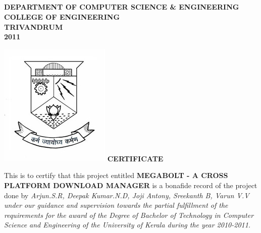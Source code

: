 \begin{cert}
\section*{}
\thispagestyle{empty}
\begin{center}
  {\large \bf DEPARTMENT OF COMPUTER SCIENCE \& ENGINEERING}\\
  {\large \bf COLLEGE OF ENGINEERING}\\
  {\small \bf TRIVANDRUM}\\
  {\small \bf 2011}\\
  \vspace{7.5mm}
  \begin{center}
    \centering
    \includegraphics{pic/cetemblem.jpg}
                    {\underline \large \bf CERTIFICATE}\\
  \end{center}
\end{center}
This is to certify that this project entitled {\bf \textsc MEGABOLT - A CROSS 
  PLATFORM DOWNLOAD MANAGER} is a bonafide record of the project done by 
\it{\textsc Arjun.S.R, Deepak Kumar.N.D, Joji Antony, Sreekanth B, Varun V.V} 
under our guidance and supervision towards the partial fulfillment of the 
requirements for the award of the Degree of Bachelor of Technology in Computer 
Science and Engineering of the University of Kerala during the year 2010-2011.
\end{cert}

